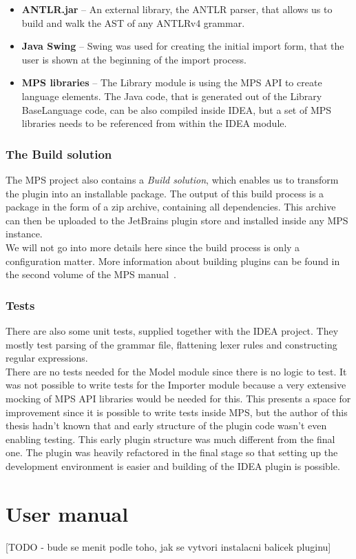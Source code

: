 \begin{itemize}
	\item \textbf{ANTLR.jar} -- An external library, the ANTLR parser, that allows us to build and walk the AST of any ANTLRv4 grammar.
	
	\item \textbf{Java Swing} -- Swing was used for creating the initial import form, that the user is shown at the beginning of the import process.
	
	\item \textbf{MPS libraries} -- The Library module is using the MPS API to create language elements. The Java code, that is generated out of the Library BaseLanguage code, can be also compiled inside IDEA, but a set of MPS libraries needs to be referenced from within the IDEA module.
\end{itemize}

\subsubsection{The Build solution}

The MPS project also contains a \textit{Build solution}, which enables us to transform the plugin into an installable package.
The output of this build process is a package in the form of a zip archive, containing all dependencies.
This archive can then be uploaded to the JetBrains plugin store and installed inside any MPS instance.
\\

We will not go into more details here since the build process is only a configuration matter.
More information about building plugins can be found in the second volume of the MPS manual~\cite{MPS2}.

\subsubsection{Tests}

There are also some unit tests, supplied together with the IDEA project.
They mostly test parsing of the grammar file, flattening lexer rules and constructing regular expressions.
\\

There are no tests needed for the Model module since there is no logic to test.
It was not possible to write tests for the Importer module because a very extensive mocking of MPS API libraries would be needed for this.
This presents a space for improvement since it is possible to write tests inside MPS, but the author of this thesis hadn't known that and early structure of the plugin code wasn't even enabling testing.
This early plugin structure was much different from the final one.
The plugin was heavily refactored in the final stage so that setting up the development environment is easier and building of the IDEA plugin is possible.

\section{User manual}

[TODO - bude se menit podle toho, jak se vytvori instalacni balicek pluginu]
